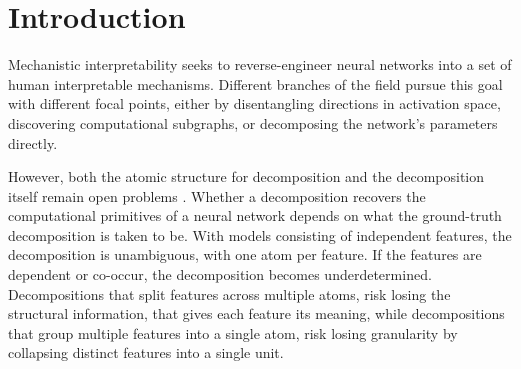 \documentclass{article}
\begin{document}
\newpage
\tableofcontents
\thispagestyle{empty}
\newpage
\begin{abstract}
Parameter decomposition methods aim to express a trained network
as a sum of simpler subcomponents that are faithful to the model's
weights, with each subcomponent corresponding to a distinct mechanism.
Stochastic Parameter Decomposition (SPD) does so by constraining each
subcomponent to its simplest, rank-one form and learning an importance
assignment that decides which subcomponents are responsible for
a given input. Because the subcomponents are constrained to be
rank-one, higher-dimensional features cannot be captured during
training and must instead be reassembled by clustering multiple
rank-one subcomponents after training.
To explore whether this grouping can instead be done during training,
the SPD architecture is adapted to use rank k
subcomponents together with a relational importance assignment
that computes importance across subcomponents rather than independently for each subcomponent.
Alongside this, a new toy model, the Toy Model of Geometry, is introduced
to evaluate the method in a higher-dimensional setting. The results suggest that,
while the reformulation produces sparser importance assignments,
they appear to be a poor guide to the underlying decomposition, where despite complete ownership being assigned to individual subcomponents,
they only partially reconstruct the underlying feature.\\
GitHub code can be found \href{https://github.com/Knudknudknud/DS-Thesis}{[here]} and
Wandb training logs \href{https://wandb.ai/knsoe24-syddansk-universitetsforlag-university-press-of-/Thesis\%20runs?nw=nwuserknsoe24}{[here]}.
\end{abstract}


\section{Introduction}

Mechanistic interpretability seeks to reverse-engineer neural networks into a set of
human interpretable mechanisms. Different branches of the field pursue this goal with different
focal points, either by disentangling directions in activation space, discovering computational subgraphs, or
decomposing the network's parameters directly.

However, both the atomic structure for decomposition
 and the decomposition itself remain open problems
\autocite{sharkey2025openproblemsmechanisticinterpretability}.
Whether a decomposition recovers the computational primitives
of a neural network depends on what the ground-truth decomposition
is taken to be. With models consisting of independent features,
the decomposition is unambiguous, with one atom per feature.
If the features are dependent or co-occur, the decomposition becomes underdetermined.
Decompositions that split features across multiple atoms, risk losing the structural information, that gives each feature its meaning,
while decompositions that group multiple features into a single atom, risk losing granularity by collapsing distinct features into a single unit.
\end{document}
